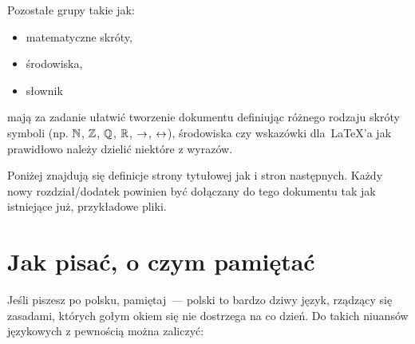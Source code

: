 Pozostałe grupy takie jak:

\begin{itemize}
	\item matematyczne skróty,
	\item środowiska,
	\item słownik
\end{itemize}
mają za zadanie ułatwić tworzenie dokumentu definiując różnego rodzaju skróty symboli (np. $\mathbb{N}$, $\mathbb{Z}$, $\mathbb{Q}$, $\mathbb{R}$, $\rightarrow$, $\leftrightarrow$), środowiska czy wskazówki dla~\LaTeX'a jak prawidłowo należy dzielić niektóre z wyrazów.

Poniżej znajdują się definicje strony tytułowej jak i stron następnych.
Każdy nowy rozdział/dodatek powinien być dołączany do tego dokumentu tak jak istniejące już, przykładowe pliki.

\section{Jak pisać, o czym pamiętać}

Jeśli piszesz po polsku, pamiętaj~--- polski to bardzo dziwy język, rządzący się zasadami, których gołym okiem się nie dostrzega na co dzień.
Do takich niuansów językowych z pewnością można zaliczyć:

